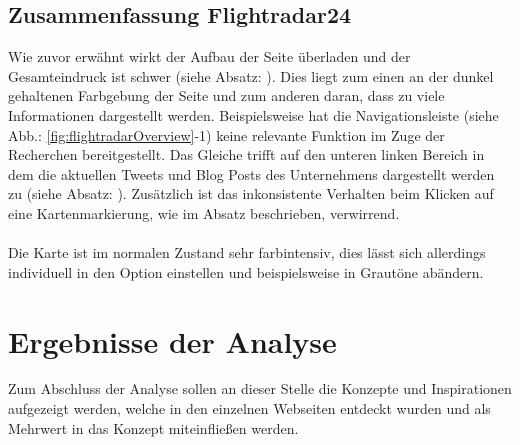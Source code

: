 \documentclass[../Bachelorarbeit.tex]{subfiles}
\begin{document}
\subsection{Zusammenfassung Flightradar24}
Wie zuvor erwähnt wirkt der Aufbau der Seite überladen und der Gesamteindruck ist schwer (siehe Absatz: ).
Dies liegt zum einen an der dunkel gehaltenen Farbgebung der Seite und zum anderen daran, dass zu viele Informationen dargestellt werden.
Beispielsweise hat die Navigationsleiste (siehe Abb.: \ref{fig:flightradarOverview}-1) keine relevante Funktion im Zuge der Recherchen bereitgestellt. 
Das Gleiche trifft auf den unteren linken Bereich in dem die aktuellen Tweets und Blog Posts des Unternehmens dargestellt werden zu (siehe Absatz: ). 
Zusätzlich ist das inkonsistente Verhalten beim Klicken auf eine Kartenmarkierung, wie im Absatz  beschrieben, verwirrend. 
\\
\\
Die Karte ist im normalen Zustand sehr farbintensiv, dies lässt sich allerdings individuell in den Option einstellen und beispielsweise in Grautöne abändern.
\newpage
\section{Ergebnisse der Analyse}
Zum Abschluss der Analyse sollen an dieser Stelle die Konzepte und Inspirationen aufgezeigt werden, welche in den einzelnen Webseiten entdeckt wurden und als Mehrwert in das Konzept miteinfließen werden.
\end{document}
